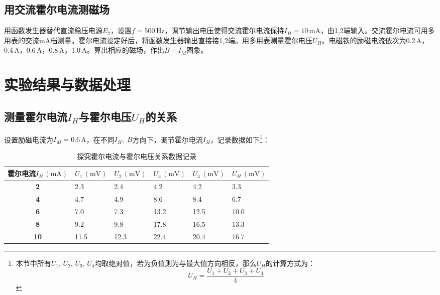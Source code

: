 \documentclass[UTF-8,twoside,cs4size]{ctexart}
\begin{document}
	\subsection{用交流霍尔电流测磁场}
	用函数发生器替代直流稳压电源$ E_2 $，设置$ f=500\,\mathrm{Hz} $，调节输出电压使得交流霍尔电流保持$ I_H=10\,\mathrm{mA} $，由1,2端输入。交流霍尔电流可用多用表的交流mA档测量。霍尔电流设定好后，将函数发生器输出直接接1,2端。用多用表测量霍尔电压$ U_H $。电磁铁的励磁电流依次为0.2\,A，0.4\,A，0.6\,A，0.8\,A，1.0\,A。算出相应的磁场，作出$ B-I_M $图象。
	
	\section{实验结果与数据处理}
	\subsection{测量霍尔电流$ I_H $与霍尔电压$ U_H $的关系}
	设置励磁电流为$ I_M=0.6\,\mathrm A $，在不同$ I_H,\;B $方向下，调节霍尔电流$ I_H $，记录数据如下\footnote{本节中所有$ U_1,\,U_2,\,U_3,\,U_4 $均取绝对值，若为负值则为与最大值方向相反，那么$ U_H $的计算方式为：
	\[U_H=\frac{U_1+U_2+U_3+U_4}{4}\]}：
	\begin{table}[!h]
		\centering
		\renewcommand\arraystretch{1.5}
		\caption{探究霍尔电流与霍尔电压关系数据记录}
		\begin{tabularx}{\textwidth}{|c|Y|Y|Y|Y|Y|}
			\hline
			\textbf{霍尔电流$ I_H\,(\mathrm{mA}) $}&$ U_1\,(\mathrm{mV}) $&$ U_2\,(\mathrm{mV}) $&$ U_3\,(\mathrm{mV}) $&$ U_4\,(\mathrm{mV}) $&$ U_H\,(\mathrm{mV}) $\\
			\hline
			\textbf{2}&2.3&2.4&4.2&4.2&3.3\\
			\hline
			\textbf{4}&4.7&4.9&8.6&8.4&6.7\\
			\hline
			\textbf{6}&7.0&7.3&13.2&12.5&10.0\\
			\hline
			\textbf{8}&9.2&9.8&17.8&16.5&13.3\\
			\hline
			\textbf{10}&11.5&12.3&22.4&20.4&16.7\\
			\hline
		\end{tabularx}
	\end{table}
\end{document}
